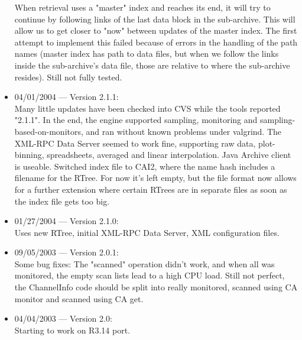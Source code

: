 \begin{itemize}
When retrieval uses a "master" index and reaches
its end, it will try to continue by following
links of the last data block in the sub-archive.
This will allow us to get closer to "now" between
updates of the master index.
The first attempt to implement this failed because
of errors in the handling of the path names
(master index has path to data files, but when
we follow the links inside the sub-archive's data
file, those are relative to where the sub-archive resides).
Still not fully tested.

\item 04/01/2004 --- Version 2.1.1:\\
Many little updates have been checked into CVS
while the tools reported "2.1.1".
In the end, the engine supported sampling, monitoring
and sampling-based-on-monitors, and ran without known problems
under valgrind.
The XML-RPC Data Server seemed to work fine, supporting
raw data, plot-binning, spreadsheets, averaged and linear interpolation.
Java Archive client is useable.
Switched index file to CAI2, where the name hash includes a filename
for the RTree. For now it's left empty, but the file format now
allows for a further extension where certain RTrees are in separate
files as soon as the index file gets too big.

\item 01/27/2004 --- Version 2.1.0:\\
Uses new RTree, initial XML-RPC Data Server, XML configuration files.

\item 09/05/2003 --- Version 2.0.1:\\
Some bug fixes:
The  "scanned"  operation didn't work, and when all was monitored,
the  empty  scan lists lead to a high CPU load. Still not perfect,
the  ChannelInfo  code  should  be  split  into  really monitored,
scanned using CA monitor and scanned using CA get.

\item 04/04/2003 --- Version 2.0:\\
Starting to work on R3.14 port.
\end{itemize}
